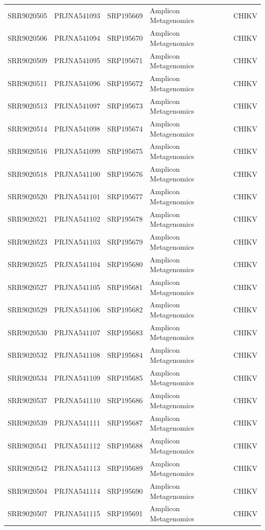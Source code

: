 \begin{longtable}{@{}lllll@{}}
SRR9020505 & PRJNA541093 & SRP195669 & Amplicon Metagenomics & CHIKV    \\
SRR9020506 & PRJNA541094 & SRP195670 & Amplicon Metagenomics & CHIKV    \\
SRR9020509 & PRJNA541095 & SRP195671 & Amplicon Metagenomics & CHIKV    \\
SRR9020511 & PRJNA541096 & SRP195672 & Amplicon Metagenomics & CHIKV    \\
SRR9020513 & PRJNA541097 & SRP195673 & Amplicon Metagenomics & CHIKV    \\
SRR9020514 & PRJNA541098 & SRP195674 & Amplicon Metagenomics & CHIKV    \\
SRR9020516 & PRJNA541099 & SRP195675 & Amplicon Metagenomics & CHIKV    \\
SRR9020518 & PRJNA541100 & SRP195676 & Amplicon Metagenomics & CHIKV    \\
SRR9020520 & PRJNA541101 & SRP195677 & Amplicon Metagenomics & CHIKV    \\
SRR9020521 & PRJNA541102 & SRP195678 & Amplicon Metagenomics & CHIKV    \\
SRR9020523 & PRJNA541103 & SRP195679 & Amplicon Metagenomics & CHIKV    \\
SRR9020525 & PRJNA541104 & SRP195680 & Amplicon Metagenomics & CHIKV    \\
SRR9020527 & PRJNA541105 & SRP195681 & Amplicon Metagenomics & CHIKV    \\
SRR9020529 & PRJNA541106 & SRP195682 & Amplicon Metagenomics & CHIKV    \\
SRR9020530 & PRJNA541107 & SRP195683 & Amplicon Metagenomics & CHIKV    \\
SRR9020532 & PRJNA541108 & SRP195684 & Amplicon Metagenomics & CHIKV    \\
SRR9020534 & PRJNA541109 & SRP195685 & Amplicon Metagenomics & CHIKV    \\
SRR9020537 & PRJNA541110 & SRP195686 & Amplicon Metagenomics & CHIKV    \\
SRR9020539 & PRJNA541111 & SRP195687 & Amplicon Metagenomics & CHIKV    \\
SRR9020541 & PRJNA541112 & SRP195688 & Amplicon Metagenomics & CHIKV    \\
SRR9020542 & PRJNA541113 & SRP195689 & Amplicon Metagenomics & CHIKV    \\
SRR9020504 & PRJNA541114 & SRP195690 & Amplicon Metagenomics & CHIKV    \\
SRR9020507 & PRJNA541115 & SRP195691 & Amplicon Metagenomics & CHIKV    \\

\end{longtable}
